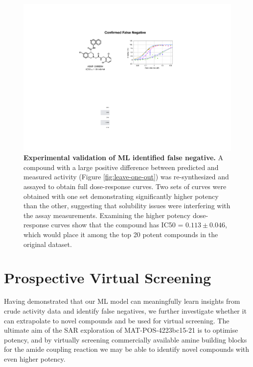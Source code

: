
\begin{figure}
 \centering
 \includegraphics[width=\textwidth]{Chapters/Crude/Figs/false_negative.pdf}
 \caption{\textbf{Experimental validation of ML identified false negative.} A compound with a large positive difference between predicted and measured activity (Figure \ref{fig:leave-one-out}) was re-synthesized and assayed to obtain full dose-response curves. Two sets of curves were obtained with one set demonstrating significantly higher potency than the other, suggesting that solubility issues were interfering with the assay measurements. Examining the higher potency dose-response curves show that the compound has IC50 = $0.113\pm0.046$\uM, which would place it among the top 20 potent compounds in the original dataset.}
 \label{fig:false_negative}
\end{figure}

\section{Prospective Virtual Screening}

Having demonstrated that our ML model can meaningfully learn insights from crude activity data and identify false negatives, we further investigate whether it can extrapolate to novel compounds and be used for virtual screening. The ultimate aim of the SAR exploration of MAT-POS-4223bc15-21 is to optimise potency, and by virtually screening commercially available amine building blocks for the amide coupling reaction we may be able to identify novel compounds with even higher potency.

